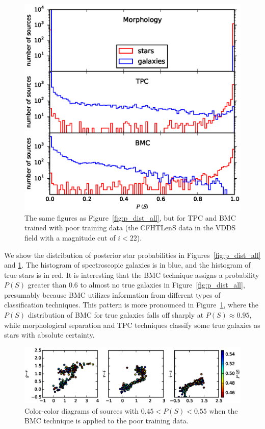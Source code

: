 \documentclass[useAMS,usenatbib]{mn2e}
\begin{document}
\begin{figure}
\begin{minipage}[t]{0.49\linewidth}
    \includegraphics[width=\textwidth]{figures/p_dist_cut.eps}
    \caption{The same figures as Figure~\ref{fig:p_dist_all},
             but for TPC and BMC trained with 
             poor training data
             (the CFHTLenS data in the VDDS field
             with a magnitude cut of $i<22$).}
    \label{fig:p_dist_cut}
  \end{minipage}
\end{figure}

We show the distribution of posterior star probabilities
in Figures~\ref{fig:p_dist_all} and \ref{fig:p_dist_cut}.
The histogram of spectroscopic galaxies is in blue,
and the histogram of true stars is in red.
It is interesting that the BMC technique assigns
a probability $P\left(S\right)$ greater than 0.6
to almost no true galaxies in Figure~\ref{fig:p_dist_all},
presumably because BMC utilizes information from
different types of classification techniques.
This pattern is more pronounced in Figure~\ref{fig:p_dist_cut},
where the $P\left(S\right)$ distribution of BMC for true galaxies
falls off sharply at $P\left(S\right)\approx0.95$,
while morphological separation and TPC techniques
classify some true galaxies as stars with absolute certainty.


\begin{figure}
  \centering
  \includegraphics[width=\linewidth]{figures/color_color.eps}
  \caption{Color-color diagrams of sources with
           $0.45<P\left(S\right)<0.55$ when the BMC technique
           is applied to the poor training data.}
  \label{fig:color_color}
\end{figure}
\end{document}
